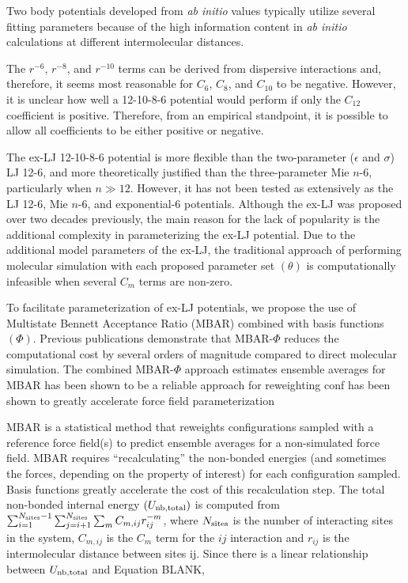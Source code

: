 \documentclass[11pt,a4paper]{article}
\begin{document}
Two body potentials developed from \textit{ab initio} values typically utilize several fitting parameters because of the high information content in \textit{ab initio} calculations at different intermolecular distances. 

The $r^{-6}$, $r^{-8}$, and $r^{-10}$ terms can be derived from dispersive interactions and, therefore, it seems most reasonable for $C_6$, $C_8$, and $C_{10}$ to be negative. However, it is unclear how well a 12-10-8-6 potential would perform if only the $C_{12}$ coefficient is positive. Therefore, from an empirical standpoint, it is possible to allow all coefficients to be either positive or negative. 

The ex-LJ 12-10-8-6 potential is more flexible than the two-parameter ($\epsilon$ and $\sigma$) LJ 12-6, and more theoretically justified than the three-parameter Mie $n$-6, particularly when $n \gg 12$. However, it has not been tested as extensively as the LJ 12-6, Mie $n$-6, and exponential-6 potentials. Although the ex-LJ was proposed over two decades previously, the main reason for the lack of popularity is the additional complexity in parameterizing the ex-LJ potential. Due to the additional model parameters of the ex-LJ, the traditional approach of performing molecular simulation with each proposed parameter set $(\theta)$ is computationally infeasible when several $C_m$ terms are non-zero.

To facilitate parameterization of ex-LJ potentials, we propose the use of Multistate Bennett Acceptance Ratio (MBAR) combined with basis functions $(\Phi)$. Previous publications demonstrate that MBAR-$\Phi$ reduces the computational cost by several orders of magnitude compared to direct molecular simulation. The combined MBAR-$\Phi$ approach estimates ensemble averages for   MBAR has been shown to be a reliable approach for reweighting conf has been shown to greatly accelerate force field parameterization

MBAR is a statistical method that reweights configurations sampled with a reference force field(s) to predict ensemble averages for a non-simulated force field. MBAR requires ``recalculating'' the non-bonded energies (and sometimes the forces, depending on the property of interest) for each configuration sampled. Basis functions greatly accelerate the cost of this recalculation step. The total non-bonded internal energy $(U_{\rm nb, total})$ is computed from $\sum_{i=1}^{N_{\rm sites}-1} \sum_{j=i+1}^{N_{\rm sites}} \sum_m C_{m,ij} r_{ij}^{-m}$, where $N_{\rm sites}$ is the number of interacting sites in the system, $C_{m,ij}$ is the $C_{m}$ term for the $ij$ interaction and $r_{ij}$ is the intermolecular distance between sites ij. Since there is a linear relationship between $U_{\rm nb, total}$ and Equation BLANK,
\end{document}
